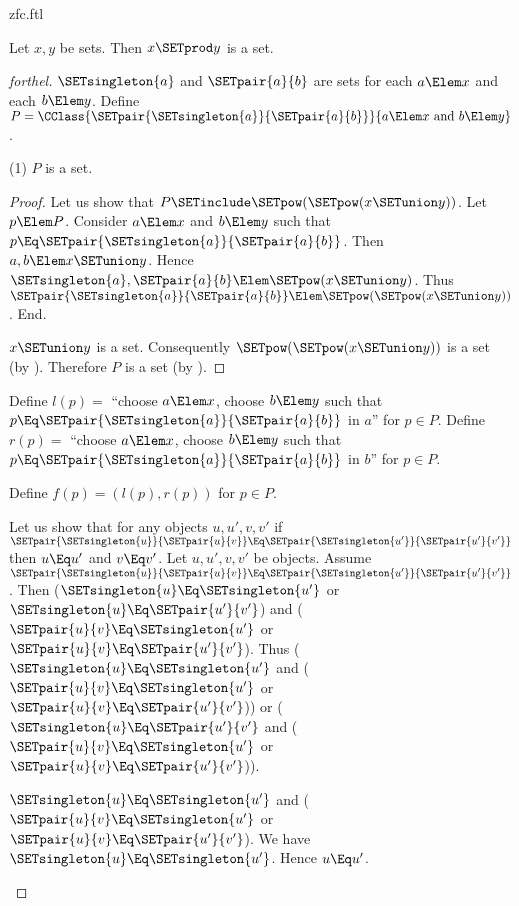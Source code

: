 \documentclass{stex}
\begin{document}
\begin{smodule}{zfc.ftl}
\begin{proposition}[forthel,id=FOUNDATIONS_10_4458706448154624]
  Let $x, y$ be sets.
  Then $x \SETprod y$ is a set.
\end{proposition}
\begin{proof}[forthel]
  $\SETsingleton{a}$ and $\SETpair{a}{b}$ are sets for each $a \Elem x$ and each $b \Elem y$.
  Define $P = \CClass{\SETpair{\SETsingleton{a}}{\SETpair{a}{b}}}{a \Elem x\text{ and }b \Elem y}$.

  (1) $P$ is a set.
  \begin{proof}
    Let us show that $P \SETinclude \SETpow(\SETpow(x \SETunion y))$.
      Let $p \Elem P$.
      Consider $a \Elem x$ and $b \Elem y$ such that $p \Eq \SETpair{\SETsingleton{a}}{\SETpair{a}{b}}$.
      Then $a, b \Elem x \SETunion y$.
      Hence $\SETsingleton{a}, \SETpair{a}{b} \Elem \SETpow(x \SETunion y)$.
      Thus $\SETpair{\SETsingleton{a}}{\SETpair{a}{b}} \Elem \SETpow(\SETpow(x \SETunion y))$.
    End.

    $x \SETunion y$ is a set.
    Consequently $\SETpow(\SETpow(x \SETunion y))$ is a set (by ).
    Therefore $P$ is a set (by ).
  \end{proof}

  Define $l(p) =$ ``choose $a \Elem x$, choose $b \Elem y$ such that $p \Eq \SETpair{\SETsingleton{a}}{\SETpair{a}{b}}$ in $a$'' for $p \in P$.
  Define $r(p) =$ ``choose $a \Elem x$, choose $b \Elem y$ such that $p \Eq \SETpair{\SETsingleton{a}}{\SETpair{a}{b}}$ in $b$'' for $p \in P$.

  Define $f(p) = (l(p), r(p))$ for $p \in P$.

  Let us show that for any objects $u, u', v, v'$ if
  $\SETpair{\SETsingleton{u}}{\SETpair{u}{v}} \Eq \SETpair{\SETsingleton{u'}}{\SETpair{u'}{v'}}$ then $u \Eq u'$ and $v \Eq v'$.
    Let $u, u', v, v'$ be objects.
    Assume $\SETpair{\SETsingleton{u}}{\SETpair{u}{v}} \Eq \SETpair{\SETsingleton{u'}}{\SETpair{u'}{v'}}$.
    Then ($\SETsingleton{u} \Eq \SETsingleton{u'}$ or $\SETsingleton{u} \Eq \SETpair{u'}{v'}$) and ($\SETpair{u}{v} \Eq \SETsingleton{u'}$ or $\SETpair{u}{v} \Eq \SETpair{u'}{v'}$).
    Thus ($\SETsingleton{u} \Eq \SETsingleton{u'}$ and ($\SETpair{u}{v} \Eq \SETsingleton{u'}$ or $\SETpair{u}{v} \Eq \SETpair{u'}{v'}$)) or ($\SETsingleton{u} \Eq \SETpair{u'}{v'}$ and ($\SETpair{u}{v} \Eq \SETsingleton{u'}$ or $\SETpair{u}{v} \Eq \SETpair{u'}{v'}$)).

    \begin{case}{$\SETsingleton{u} \Eq \SETsingleton{u'}$ and ($\SETpair{u}{v} \Eq \SETsingleton{u'}$ or $\SETpair{u}{v} \Eq \SETpair{u'}{v'}$).}
      We have $\SETsingleton{u} \Eq \SETsingleton{u'}$.
      Hence $u \Eq u'$.


\end{case}
\end{proof}
\end{smodule}
\end{document}
